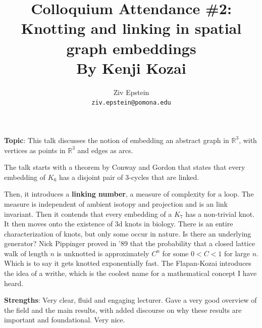 \documentclass[12pt]{article}
\begin{document}
		
		
		\nocite{*}
		
		\title{Colloquium Attendance \#2: Knotting and linking in spatial graph embeddings \\ By Kenji Kozai}
		
		
		\author{Ziv Epstein \\ 
			\texttt{ziv.epstein@pomona.edu}}
		
		\maketitle
		
		\textbf{Topic}: This talk discusses the notion of embedding an abstract graph in $\mathbb{R}^3$, with vertices as points in $\mathbb{R}^3$ and edges as arcs.
		
		The talk starts with a theorem by Conway and Gordon that states that every embedding of $K_6$ has a disjoint pair of 3-cycles that are linked.
		
		Then, it introduces a\textbf{ linking number}, a measure of complexity for a loop. The measure is independent of ambient isotopy and projection and is an link invariant. 
		Then it contends that every embedding of a $K_7$ has a non-trivial knot. It then moves onto the existence of 3d knots in biology. There is an entire characterization of knots, but only some occur in nature. Is there an underlying generator?
		Nick Pippinger proved in '89 that the probability that a closed lattice walk of length $n$ is unknotted is approximately $C^n$ for some $0<C<1$ for large $n$. Which is to say it gets knotted exponentially fast. The Flapan-Kozai introduces the idea of a writhe, which is the coolest name for a mathematical concept I have heard.
		
		\textbf{Strengths}: Very clear, fluid and engaging lecturer. Gave a very good overview of the field and the main results, with added discourse on why these results are important and foundational. Very nice. 
		
\end{document}
